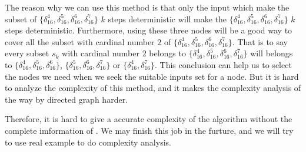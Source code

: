The reason why we can use this method is that only the input which make the subset of $\{\delta_{16}^4,\delta_{16}^5,\delta_{16}^6,\delta_{16}^7\}$ $k$ steps deterministic will make the $\{\delta_{16}^4,\delta_{16}^5,\delta_{16}^6,\delta_{16}^7\}$ $k$ steps deterministic. Furthermore, using these three nodes will be a good way to cover all the subset with cardinal number $2$ of $\{\delta_{16}^4,\delta_{16}^5,\delta_{16}^6,\delta_{16}^7\}$. That is to say every subset $s_k$ with cardinal number $2$ belongs to $\{\delta_{16}^4,\delta_{16}^5,\delta_{16}^6,\delta_{16}^7\}$ will belongs to $\{\delta_{16}^4,\delta_{16}^5,\delta_{16}^6\}$, $\{\delta_{16}^5,\delta_{16}^6,\delta_{16}^7\}$ or $\{\delta_{16}^4,\delta_{16}^7\}$. This conclusion can help us to select the nodes we need when we seek the suitable inputs set for a node. But it is hard to analyze the complexity of this method, and it makes the complexity analysis of the way by directed graph harder.

Therefore, it is hard to give a accurate complexity of the algorithm without the complete imformation of \BCNs. We may finish this job in the furture, and we will try to use real example to do complexity analysis.
